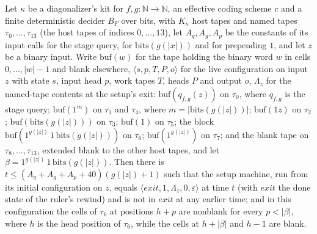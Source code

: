 \begin{theorem}
\label{Turing.NTimeDiag.dz_setup_facts}
\leanok
{}
Let $\kappa$ be a diagonalizer's kit for $f, g : \mathbb{N} \to \mathbb{N}$, an effective coding scheme $c$ and a finite deterministic decider $B_F$ over bits, with $K_\kappa$ host tapes and named tapes $\tau_0, \dots, \tau_{13}$ (the host tapes of indices $0, \dots, 13$), let $A_q, A_g, A_p$ be the constants of its input calls for the stage query, for $\mathrm{bits}(g(|x|))$ and for prepending $1$, and let $z$ be a binary input. Write $\mathrm{buf}(w)$ for the tape holding the binary word $w$ in cells $0, \dots, |w| - 1$ and blank elsewhere, $\langle s, p, T, P, o\rangle$ for the live configuration on input $z$ with state $s$, input head $p$, work tapes $T$, heads $P$ and output $o$, $\Lambda_z$ for the named-tape contents at the setup's exit: $\mathrm{buf}(q_{f,g}(z))$ on $\tau_0$, where $q_{f,g}$ is the stage query; $\mathrm{buf}(1^m)$ on $\tau_1$ and $\tau_4$, where $m = |\mathrm{bits}(g(|z|))|$; $\mathrm{buf}(1z)$ on $\tau_2$; $\mathrm{buf}(\mathrm{bits}(g(|z|)))$ on $\tau_3$; $\mathrm{buf}(1)$ on $\tau_5$; the block $\mathrm{buf}(1^{g(|z|)}\,1\,\mathrm{bits}(g(|z|)))$ on $\tau_6$; $\mathrm{buf}(1^{g(|z|)})$ on $\tau_7$; and the blank tape on $\tau_8, \dots, \tau_{13}$, extended blank to the other host tapes, and let $\beta = 1^{g(|z|)}\,1\,\mathrm{bits}(g(|z|))$. Then there is $t \le (A_q + A_g + A_p + 40)(g(|z|) + 1)$ such that the setup machine, run from its initial configuration on $z$, equals $\langle \mathit{exit}, 1, \Lambda_z, 0, \varepsilon\rangle$ at time $t$ (with $\mathit{exit}$ the done state of the ruler's rewind) and is not in $\mathit{exit}$ at any earlier time; and in this configuration the cells of $\tau_6$ at positions $h + p$ are nonblank for every $p < |\beta|$, where $h$ is the head position of $\tau_6$, while the cells at $h + |\beta|$ and $h - 1$ are blank.
\end{theorem}

